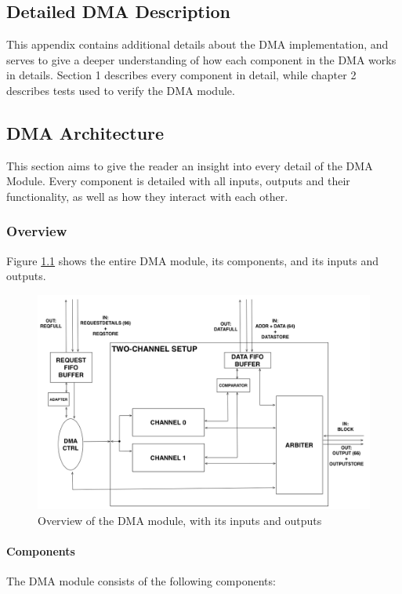 \begin{appendix}
\chapter{Detailed DMA Description}
\label{app:DMA-arch}
This appendix contains additional details about the DMA implementation, and serves to give a deeper understanding of how each component in the DMA works in details.
Section 1 describes every component in detail, while chapter 2 describes tests used to verify the DMA module.

\section{DMA Architecture}
This section aims to give the reader an insight into every detail of the DMA Module.
Every component is detailed with all inputs, outputs and their functionality, as well as how they interact with each other.

\subsection{Overview}
Figure \ref{fig:TopViewFinalSimple2IO} shows the entire DMA module, its components, and its inputs and outputs.

\begin{figure}[htb]
    \centering
    \includegraphics[width=1.0\textwidth]{Figures/DMA/TopViewFinalSimple2IO}
    \caption{Overview of the DMA module, with its inputs and outputs}
    \label{fig:TopViewFinalSimple2IO}
\end{figure}

\subsubsection{Components}
The DMA module consists of the following components:


\end{appendix}
